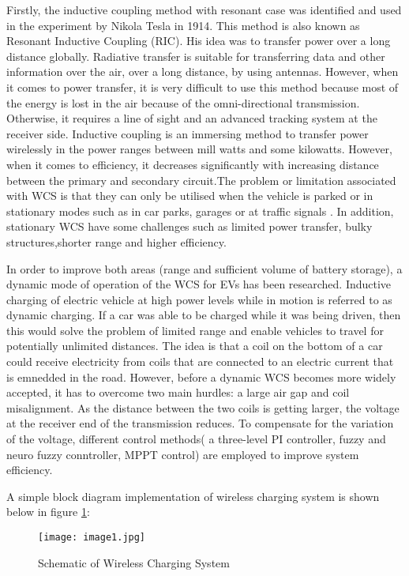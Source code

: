 \documentclass[12pt]{article}
\begin{document}
Firstly, the inductive coupling method with resonant case was identified and used in the experiment by Nikola Tesla in 1914.  This method is also known as Resonant Inductive Coupling (RIC). His idea was to transfer power over a long distance globally. Radiative transfer is suitable for transferring data and other information over the air, over a long distance, by using antennas. However, when it comes to power transfer, it is very difficult to use this method because most of the energy is lost in the air because of the omni-directional transmission. Otherwise, it requires a line of sight and an advanced tracking system at the receiver side. Inductive coupling is an immersing method to transfer power wirelessly in the power ranges between mill watts and some kilowatts.
However, when it comes to efficiency, it decreases significantly with increasing distance between the primary and secondary circuit.The problem or limitation associated with WCS is that they can only be utilised when the vehicle is parked or in stationary modes such as in car parks, garages or at traffic signals . In addition, stationary WCS have some challenges such as limited power transfer, bulky structures,shorter range and higher efficiency. 

In order to improve both areas (range and sufficient volume of battery storage), a dynamic mode of operation of the WCS for EVs has been researched. Inductive charging of electric vehicle at high power levels while in motion is referred to as dynamic charging. If a car was able to be charged while it was being driven, then this would solve the problem of limited range and enable vehicles to travel for potentially unlimited distances. The idea is that a coil on the bottom of a car could receive electricity from coils that are connected to an electric current that is emnedded in the road. However, before a dynamic WCS becomes more widely accepted, it has to overcome two main hurdles: a large air gap and coil misalignment. As the distance between the two coils is getting larger, the voltage at the receiver end of the transmission reduces. To compensate for the variation of the voltage, different control methods( a three-level PI controller, fuzzy and neuro fuzzy conntroller, MPPT control) are employed to improve system efficiency. 

A simple block diagram implementation of wireless charging system is shown below in figure \ref{fig:scheme}:
\begin{figure}[h!]
	\centering
	\texttt{[image: image1.jpg]}
	\caption{Schematic of Wireless Charging System}
	\label{fig:scheme}
\end{figure}
\newpage
\end{document}
